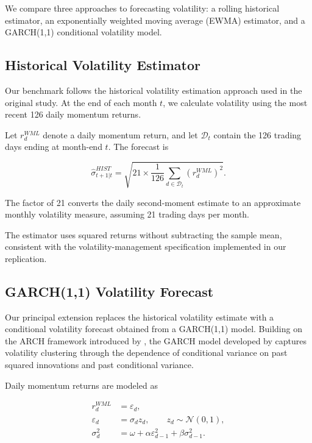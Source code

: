 \documentclass[11pt]{article}
\begin{document}
We compare three approaches to forecasting volatility:
a rolling historical estimator, an exponentially weighted
moving average (EWMA) estimator, and a GARCH(1,1)
conditional volatility model.


\subsection{Historical Volatility Estimator}

Our benchmark follows the historical volatility
estimation approach used in the original study.
At the end of each month $t$, we calculate
volatility using the most recent 126 daily
momentum returns.

Let $r_d^{WML}$ denote a daily momentum return,
and let $\mathcal{D}_t$ contain the 126 trading
days ending at month-end $t$. The forecast is

\begin{equation}
\widehat{\sigma}_{t+1|t}^{HIST}
=
\sqrt{
21 \times
\frac{1}{126}
\sum_{d \in \mathcal{D}_t}
(r_d^{WML})^2
}.
\label{eq:hist_vol}
\end{equation}

The factor of 21 converts the daily second-moment
estimate to an approximate monthly volatility
measure, assuming 21 trading days per month.

The estimator uses squared returns without
subtracting the sample mean, consistent with
the volatility-management specification
implemented in our replication.

\subsection{GARCH(1,1) Volatility Forecast}


Our principal extension replaces the historical
volatility estimate with a conditional volatility
forecast obtained from a GARCH(1,1) model.
Building on the ARCH framework introduced by
\citet{engle1982arch}, the GARCH model developed
by \citet{bollerslev1986garch} captures volatility
clustering through the dependence of conditional
variance on past squared innovations and past
conditional variance.


Daily momentum returns are modeled as

\begin{align}
r_d^{WML} &= \varepsilon_d, \\
\varepsilon_d &= \sigma_d z_d,
\qquad z_d \sim \mathcal{N}(0,1), \\
\sigma_d^2
&=
\omega
+
\alpha \varepsilon_{d-1}^2
+
\beta \sigma_{d-1}^2.
\label{eq:garch}
\end{align}
\end{document}
